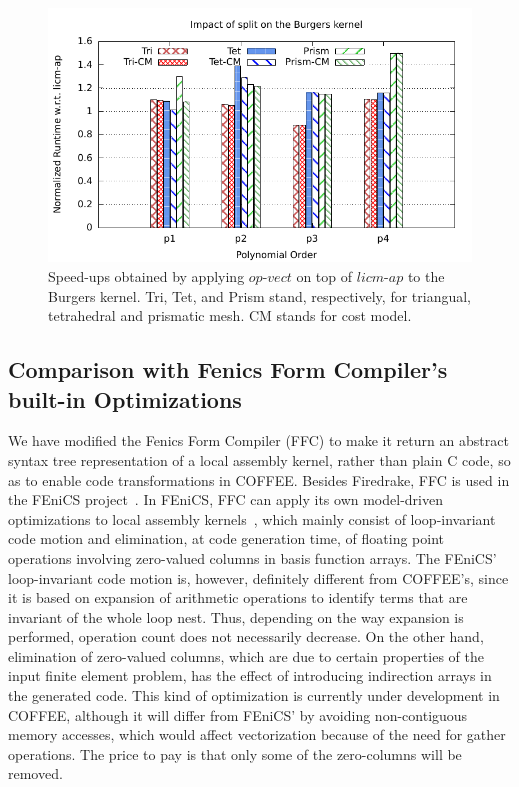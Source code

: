 \documentclass[conference]{IEEEtran}
\begin{document}
\begin{figure}[h]
\includegraphics[scale=0.7]{Pictures/burgers-normalized-split.pdf}
\caption{Speed-ups obtained by applying $op$-$vect$ on top of $licm$-$ap$ to the Burgers kernel. Tri, Tet, and Prism stand, respectively, for triangual, tetrahedral and prismatic mesh. CM stands for cost model.}
\label{fig:split-burgers-speedup}
\end{figure}


\subsection{Comparison with Fenics Form Compiler's built-in Optimizations}
We have modified the Fenics Form Compiler (FFC) to make it return an abstract syntax tree representation of a local assembly kernel, rather than plain C code, so as to enable code transformations in COFFEE. Besides Firedrake, FFC is used in the FEniCS project~\cite{Fenics}. In FEniCS, FFC can apply its own model-driven optimizations to local assembly kernels~\cite{quadrature1}, which mainly consist of loop-invariant code motion and elimination, at code generation time, of floating point operations involving zero-valued columns in basis function arrays. The FEniCS' loop-invariant code motion is, however, definitely different from COFFEE's, since it is based on expansion of arithmetic operations to identify terms that are invariant of the whole loop nest. Thus, depending on the way expansion is performed, operation count does not necessarily decrease. On the other hand, elimination of zero-valued columns, which are due to certain properties of the input finite element problem, has the effect of introducing indirection arrays in the generated code. This kind of optimization is currently under development in COFFEE, although it will differ from FEniCS' by avoiding non-contiguous memory accesses, which would affect vectorization because of the need for gather operations. The price to pay is that only some of the zero-columns will be removed.
\end{document}
